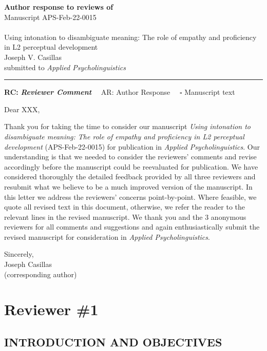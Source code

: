 \documentclass[draft]{article}
\begin{document}
{\Large\bf Author response to reviews of}\\[1em]
Manuscript APS-Feb-22-0015\\ \\
{\Large Using intonation to disambiguate meaning: The role of empathy and proficiency in L2 perceptual development}\\[1em]
{Joseph V. Casillas}\\
{submitted to \it Applied Psycholinguistics }\\
\hrule

\hfill {\bfseries RC:} \textbf{\textit{Reviewer Comment}}\(\quad\) AR: Author Response \(\quad\square\) Manuscript text

\vspace{2em}

Dear XXX,

Thank you for taking the time to consider our manuscript \emph{Using intonation to disambiguate meaning: The role of empathy and proficiency in L2 perceptual development
} (APS-Feb-22-0015) for publication in \emph{Applied Psycholinguistics}.
Our understanding is that we needed to consider the reviewers' comments and revise accordingly before the manuscript could be reevaluated for publication.
We have considered thoroughly the detailed feedback provided by all three reviewers and resubmit what we believe to be a much improved version of the manuscript.
In this letter we address the reviewers' concerns point-by-point.
Where feasible, we quote all revised text in this document, otherwise, we refer the reader to the relevant lines in the revised manuscript.
We thank you and the 3 anonymous reviewers for all comments and suggestions and again enthusiastically submit the revised manuscript for consideration in \emph{Applied Psycholinguistics}.

Sincerely,\\
Joseph Casillas\\
(corresponding author)

\clearpage

\hypertarget{reviewer-1}{%
\section{Reviewer \#1}\label{reviewer-1}}

\hypertarget{introduction-and-objectives}{%
\subsection{INTRODUCTION AND OBJECTIVES}\label{introduction-and-objectives}}
\end{document}
